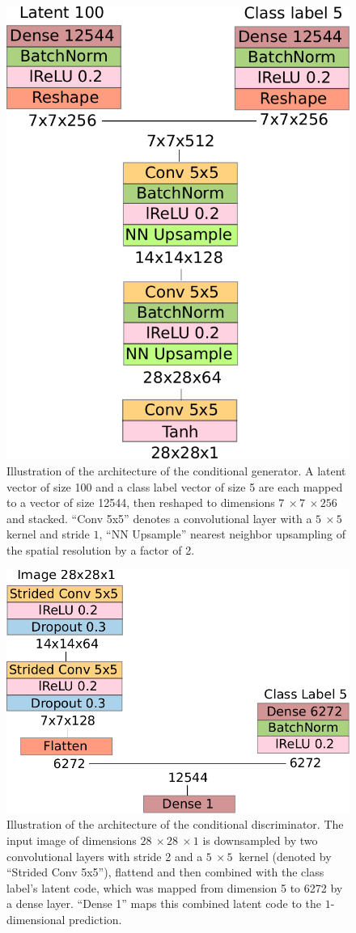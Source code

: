 \documentclass[10pt,conference,compsocconf]{IEEEtran}
\begin{document}
\begin{figure}
    \centering
    \includegraphics[width=0.58\columnwidth]{assets/cgen_arch.pdf}
    \caption{Illustration of the architecture of the conditional generator. A latent vector of size \SI{100}{} and a class label vector of size \SI{5}{} are each mapped to a vector of size \SI{12544}{}, then reshaped to dimensions $\SI{7}{}\times\SI{7}{}\times\SI{256}{}$ and stacked. ``Conv 5x5'' denotes a convolutional layer with a $\SI{5}{}\times\SI{5}{}$ kernel and stride $1$, ``NN Upsample'' nearest neighbor upsampling of the spatial resolution by a factor of \SI{2}{}.}
    \label{fig:cgen_arch}
\end{figure}

\begin{figure}
    \centering
    \includegraphics[width=0.73\columnwidth]{assets/cdis_arch.pdf}
    \caption{Illustration of the architecture of the conditional discriminator. The input image of dimensions $\SI{28}{}\times\SI{28}{}\times1$ is downsampled by two convolutional layers with stride \SI{2}{} and a $\SI{5}{}\times\SI{5}{}$ kernel (denoted by ``Strided Conv 5x5''), flattend and then combined with the class label's latent code, which was mapped from dimension \SI{5}{} to \SI{6272}{} by a dense layer. ``Dense 1'' maps this combined latent code to the $1$-dimensional prediction.}
    \label{fig:cdis_arch}
\end{figure}
\end{document}
